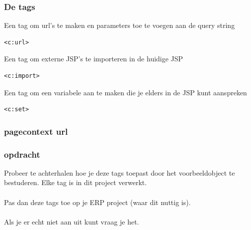 \documentclass{beamer}
\begin{document}
\begin{frame}[fragile]

\frametitle{De tags}

Een tag om url's te maken en parameters toe te voegen aan de query string

\begin{verbatim}
<c:url>
\end{verbatim}

Een tag om externe JSP's te importeren in de huidige JSP

\begin{verbatim}
<c:import>
\end{verbatim}

Een tag om een variabele aan te maken die je elders in de JSP kunt aanspreken

\begin{verbatim}
<c:set>
\end{verbatim}

\end{frame}


\begin{frame}

\frametitle{pagecontext url}

\end{frame}


\begin{frame}

\frametitle{opdracht}

Probeer te achterhalen hoe je deze tags toepast door het voorbeeldobject te bestuderen. Elke tag is in dit project verwerkt. \\~\\

Pas dan deze tags toe op je ERP project (waar dit nuttig is).\\~\\

Als je er echt niet aan uit kunt vraag je het.

\end{frame}
\end{document}
